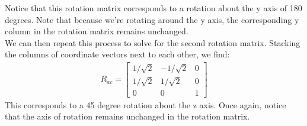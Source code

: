 \documentclass[oneside]{book}
\begin{document}
Notice that this rotation matrix corresponds to a rotation about the y axis of 180 degrees. Note that because we're rotating around the y axis, the corresponding y column in the rotation matrix remains unchanged.\\
We can then repeat this process to solve for the second rotation matrix. Stacking the columns of coordinate vectors next to each other, we find:
\begin{align}
    R_{ac} = \begin{bmatrix}
    1/\sqrt{2}& -1/\sqrt{2} & 0\\
    1/\sqrt{2} & 1/\sqrt{2} & 0\\
    0 & 0 & 1
    \end{bmatrix}
\end{align}
This corresponds to a 45 degree rotation about the z axis. Once again, notice that the axis of rotation remains unchanged in the rotation matrix.
\end{document}
